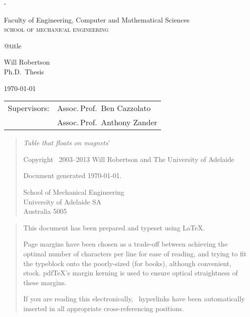 
\thispagestyle{empty}
\label{titlepage}
\calccentering{\unitlength}
\begin{adjustwidth*}{\unitlength}{-\unitlength}
\setlength{\parindent}{0pt}

\begin{flushright}
\end{flushright}

\vfill

Faculty of Engineering,
Computer and Mathematical Sciences\\
\textsc{school of mechanical engineering}

\vfill

{\Large\raggedright\csname @title\endcsname}

\vspace{10mm}

Will Robertson\\
Ph.D.\ Thesis
\vspace{10mm}

\today

\vfill

\vfill

\begin{tabular}{@{}ll}
Supervisors:    & Assoc.\,Prof.\ Ben Cazzolato  \\
                & Assoc.\,Prof.\ Anthony Zander
\end{tabular}
\end{adjustwidth*}

\newpage
\thispagestyle{empty}
\null
\vfill
\begin{quote}
  \LARGE
  \textit{Table that floats on magnets}'

  \vfill
  \normalsize
  \raggedright
  Copyright \textcopyright\ 2003--2013 Will Robertson
  and The University of Adelaide

  \bigskip
  Document generated \today.

  \bigskip
  School of Mechanical Engineering\\
  University of Adelaide SA\\
  Australia 5005\\
\end{quote}

\vfill
\begin{quotation}
  \noindent This document has been prepared and typeset using \LaTeX{}.

  Page margins have been chosen as a trade-off between achieving the
  optimal number of characters per line for ease of reading, and trying
  to fit the typeblock onto the poorly-sized (for books), although
  convenient,  stock.
  pdf\/\TeX's margin kerning is used to ensure optical straightness of these
  margins.

  If you are reading this electronically, \PDF\ hyperlinks have
  been automatically inserted in all appropriate cross-referencing positions.
\end{quotation}
\vfill
